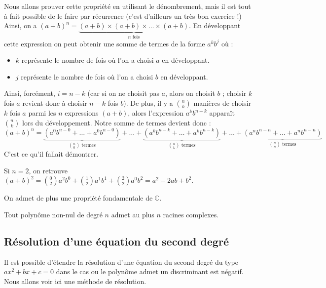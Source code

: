 	\begin{demonstration}
		\contentwidth[big]
		Nous allons prouver cette propriété en utilisant le dénombrement, mais il est tout à fait possible de le faire par récurrence (c'est d'ailleurs un très bon exercice !)
		\newpar
		Ainsi, on a $(a+b)^n = \underbrace{(a + b) \times (a + b) \times \dots \times (a + b)}_{n \text{ fois}}$.
		\newpar
		En développant cette expression on peut obtenir une somme de termes de la forme $a^k b^j$ où :
		\begin{itemize}
			\item $k$ représente le nombre de fois où l'on a choisi $a$ en développant.
			\item $j$ représente le nombre de fois où l'on a choisi $b$ en développant.
		\end{itemize}
		Ainsi, forcément, $i = n-k$ (car si on ne choisit pas $a$, alors on choisit $b$ ; choisir $k$ fois $a$ revient donc à choisir $n-k$ fois $b$).
		\newpar
		De plus, il y a $\binom{n}{k}$ manières de choisir $k$ fois $a$ parmi les $n$ expressions $(a+b)$, alors l'expression $a^k b^{n-k}$ apparaît $\binom{n}{k}$ lors du développement. Notre somme de termes devient donc :
		\[ (a+b)^n = \underbrace{(a^0b^{n-0} + \dots + a^0b^{n-0})}_{\binom{n}{0} \text{ termes}} + \dots + \underbrace{(a^kb^{n-k} + \dots + a^kb^{n-k})}_{\binom{n}{k} \text{ termes}} + \dots + \underbrace{(a^nb^{n-n} + \dots + a^nb^{n-n})}_{\binom{n}{n} \text{ termes}} \]
		C'est ce qu'il fallait démontrer.
	\end{demonstration}

	\begin{tip}
		\contentwidth[big]
		Si $n = 2$, on retrouve $(a+b)^2 = \binom{0}{2} a^2 b^0 + \binom{1}{2}a^1 b^1 + \binom{2}{2} a^0 b^2 = a^2 + 2ab + b^2$.
	\end{tip}

	On admet de plus une propriété fondamentale de $\mathbb{C}$.

	\begin{formula}
		Tout polynôme non-nul de degré $n$ admet au plus $n$ racines complexes.
	\end{formula}

	\subsection{Résolution d'une équation du second degré}

	Il est possible d'étendre la résolution d'une équation du second degré du type $ax^2 + bx + c = 0$ dans le cas ou le polynôme admet un discriminant est négatif. Nous allons voir ici une méthode de résolution.

